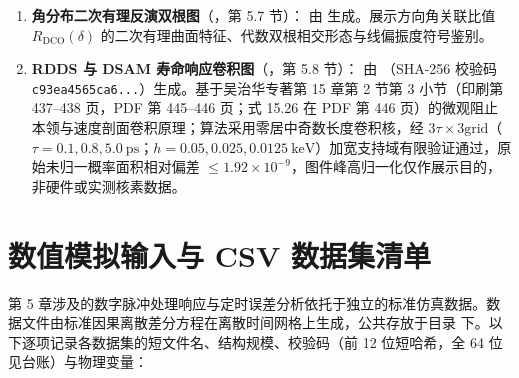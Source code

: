 \begin{enumerate}[label=(\arabic*),leftmargin=2em]
    \vspace{1ex}
    \item \textbf{角分布二次有理反演双根图}（，第 5.7 节）：
    由  生成。展示方向角关联比值 $R_{\mathrm{DCO}}(\delta)$ 的二次有理曲面特征、代数双根相交形态与线偏振度符号鉴别。
    \vspace{1ex}
    \item \textbf{RDDS 与 DSAM 寿命响应卷积图}（，第 5.8 节）：
    由 （SHA-256 校验码 \texttt{c93ea4565ca6...}）生成。基于吴治华专著第 15 章第 2 节第 3 小节（印刷第 437–438 页，PDF 第 445–446 页；式 15.26 在 PDF 第 446 页）的微观阻止本领与速度剖面卷积原理；算法采用零居中奇数长度卷积核，经 $3\tau \times 3\text{grid}$（$\tau=0.1, 0.8, 5.0\ \mathrm{ps}$；$h=0.05, 0.025, 0.0125\ \mathrm{keV}$）加宽支持域有限验证通过，原始未归一概率面积相对偏差 $\le 1.92 \times 10^{-9}$，图件峰高归一化仅作展示目的，非硬件或实测核素数据。
\end{enumerate}

\section{数值模拟输入与 CSV 数据集清单}\label{sec:appF-datasets}

第 5 章涉及的数字脉冲处理响应与定时误差分析依托于独立的标准仿真数据。数据文件由标准因果离散差分方程在离散时间网格上生成，公共存放于目录  下。以下逐项记录各数据集的短文件名、结构规模、校验码（前 12 位短哈希，全 64 位见台账）与物理变量：


